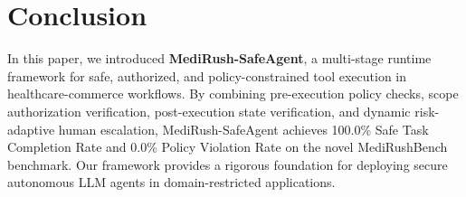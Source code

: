 \section{Conclusion}
\label{sec:conclusion}

In this paper, we introduced \textbf{MediRush-SafeAgent}, a multi-stage runtime framework for safe, authorized, and policy-constrained tool execution in healthcare-commerce workflows. By combining pre-execution policy checks, scope authorization verification, post-execution state verification, and dynamic risk-adaptive human escalation, MediRush-SafeAgent achieves 100.0\% Safe Task Completion Rate and 0.0\% Policy Violation Rate on the novel MediRushBench benchmark. Our framework provides a rigorous foundation for deploying secure autonomous LLM agents in domain-restricted applications.
